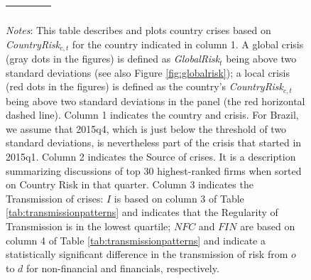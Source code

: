 \documentclass[12pt,oneside,leqno]{article}
\begin{document}
\begin{figure}[!h]
{\begin{threeparttable}
\begin{tabular}{p{.2\linewidth}p{.36\linewidth}p{.1\linewidth}p{.33\linewidth}}
{\begin{tcolorbox}[
width=1.5in,
boxsep=0pt,
left=0pt,
right=0pt,
top=2pt,
arc=0pt,
colback=white,
boxrule=.5pt
]
\end{tcolorbox}
} \\
\bottomrule
\end{tabular}
\begin{tablenotes}[flushleft]
\item {\scriptsize\textit{Notes}: This table describes and plots country crises based on \textit{CountryRisk}$_{c,t}$ for the country indicated in column 1. A global crisis (gray dots in the figures) is defined as \textit{GlobalRisk}$_{t}$ being above two standard deviations (see also Figure \ref{fig:globalrisk}); a local crisis (red dots in the figures) is defined as the country's \textit{CountryRisk}$_{c,t}$ being above two standard deviations in the panel (the red horizontal dashed line). Column 1 indicates the country and crisis. For Brazil, we assume that 2015q4, which is just below the threshold of two standard deviations, is nevertheless part of the crisis that started in 2015q1. Column 2 indicates the Source of crises. It is a description summarizing discussions of top 30 highest-ranked firms when sorted on Country Risk in that quarter. Column 3 indicates the Transmission of crises: $I$ is based on column 3 of Table \ref{tab:transmissionpatterns} and indicates that the Regularity of Transmission is in the lowest quartile; $NFC$ and $FIN$ are based on column 4 of Table \ref{tab:transmissionpatterns} and indicate a statistically significant difference in the transmission of risk from ${o}$ to $d$ for non-financial and financials, respectively.}
\end{tablenotes}
\end{threeparttable}
}
\end{figure}
\end{document}

